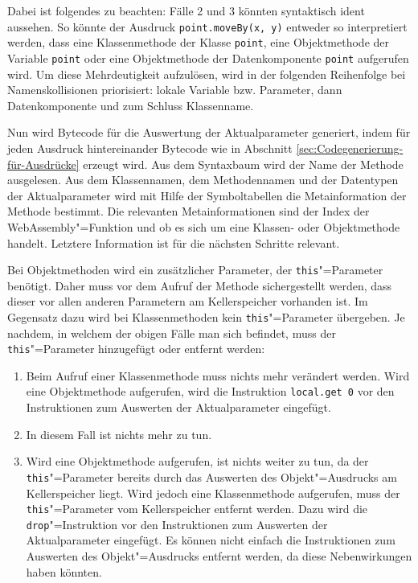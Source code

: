 Dabei ist folgendes zu beachten: Fälle 2 und 3 könnten syntaktisch ident aussehen. So könnte der Ausdruck \lstinline{point.moveBy(x, y)} entweder so interpretiert werden, dass eine Klassenmethode der Klasse \lstinline{point}, eine Objektmethode der Variable \lstinline{point} oder eine Objektmethode der Datenkomponente \lstinline{point} aufgerufen wird. Um diese Mehrdeutigkeit aufzulösen, wird in der folgenden Reihenfolge bei Namenskollisionen priorisiert: lokale Variable bzw. Parameter, dann Datenkomponente und zum Schluss Klassenname.

Nun wird Bytecode für die Auswertung der Aktualparameter generiert, indem für jeden Ausdruck hintereinander Bytecode wie in Abschnitt \ref{sec:Codegenerierung-für-Ausdrücke} erzeugt wird. Aus dem Syntaxbaum wird der Name der Methode ausgelesen. Aus dem Klassennamen, dem Methodennamen und der Datentypen der Aktualparameter wird mit Hilfe der Symboltabellen die Metainformation der Methode bestimmt. Die relevanten Metainformationen sind der Index der WebAssembly"=Funktion und ob es sich um eine Klassen- oder Objektmethode handelt. Letztere Information ist für die nächsten Schritte relevant.

Bei Objektmethoden wird ein zusätzlicher Parameter, der \lstinline{this}"=Parameter benötigt. Daher muss vor dem Aufruf der Methode sichergestellt werden, dass dieser vor allen anderen Parametern am Kellerspeicher vorhanden ist. Im Gegensatz dazu wird bei Klassenmethoden kein \lstinline{this}"=Parameter übergeben. Je nachdem, in welchem der obigen Fälle man sich befindet, muss der \lstinline{this}"=Parameter hinzugefügt oder entfernt werden:

\begin{enumerate}
    \item Beim Aufruf einer Klassenmethode muss nichts mehr verändert werden. Wird eine Objektmethode aufgerufen, wird die Instruktion \lstinline{local.get 0} vor den Instruktionen zum Auswerten der Aktualparameter eingefügt.
    \item In diesem Fall ist nichts mehr zu tun.
    \item Wird eine Objektmethode aufgerufen, ist nichts weiter zu tun, da der \lstinline{this}"=Parameter bereits durch das Auswerten des Objekt"=Ausdrucks am Kellerspeicher liegt. Wird jedoch eine Klassenmethode aufgerufen, muss der \lstinline{this}"=Parameter vom Kellerspeicher entfernt werden. Dazu wird die \lstinline{drop}"=Instruktion vor den Instruktionen zum Auswerten der Aktualparameter eingefügt. Es können nicht einfach die Instruktionen zum Auswerten des Objekt"=Ausdrucks entfernt werden, da diese Nebenwirkungen haben könnten.
\end{enumerate}


